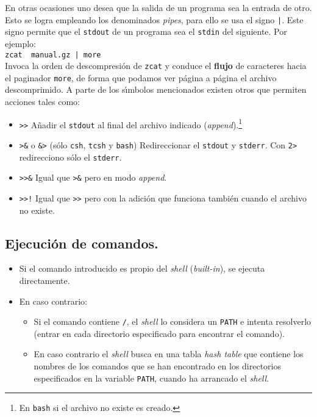 En otras ocasiones uno desea que la salida de un programa sea la
entrada de otro. Esto se logra empleando los denominados {\it pipes},
para ello se usa el signo \verb+|+. Este signo permite que el \verb+stdout+ de
un programa sea el \verb+stdin+ del siguiente. Por ejemplo:\\
\verb+zcat  manual.gz | more+\\
Invoca la orden de descompresi{\'o}n de \verb+zcat+ y conduce
el {\bf flujo} de caracteres hacia el paginador \verb+more+, de forma que
podamos ver p{\'a}gina a p{\'a}gina el archivo descomprimido.
A parte de los s{\'\i}mbolos mencionados existen otros que permiten
acciones tales como:
\begin{itemize}
\item \verb+>>+ A{\~n}adir el \verb+stdout+ al final del archivo indicado ({\it append\/}).\footnote{En {\tt bash} si el archivo no existe es creado.}
\item \verb+>&+ o \verb+&>+ (s\'olo \verb+csh+, \verb+tcsh+ y
  \verb+bash+) 
Redireccionar el \verb+stdout+ y \verb+stderr+. Con \verb+2>+
  redirecciono s{\'o}lo el \verb+stderr+.

\item \verb+>>&+ Igual que \verb+>&+ pero en modo {\it append}.
 
\item \verb+>>!+ Igual que \verb+>>+ pero con la adici{\'o}n que funciona
  tambi{\'e}n cuando el archivo no existe.

\end{itemize}



\subsection{Ejecuci{\'o}n de comandos.}

\begin{itemize}
\item Si el comando introducido es propio del {\it shell} ({\it built-in}), se
ejecuta directamente.

\item En caso contrario:
 \begin{itemize}
\item Si el comando contiene \verb+/+, el {\it shell} lo considera un \verb+PATH+ e
 intenta resolverlo (entrar en cada directorio especificado para
 encontrar el comando). 
\item En caso contrario el {\it shell} busca en una tabla {\it hash table}
  que contiene los nombres de los comandos que se han encontrado en
  los directorios especificados en la variable \verb+PATH+, cuando ha
  arrancado el {\it shell}.

\end{itemize}
\end{itemize}

